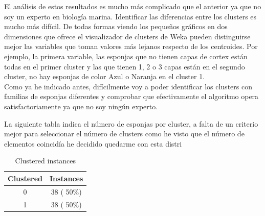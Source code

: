 \documentclass[es]{ifirak}
\begin{document}
El análisis de estos resultados es mucho más complicado que el anterior ya que no soy un experto en biología marina. Identificar las diferencias entre los clusters es mucho más difícil. De todas formas viendo los pequeños gráficos en dos dimensiones que ofrece el visualizador de clusters de Weka pueden distinguirse mejor las variables que toman valores más lejanos respecto de los centroides. Por ejemplo, la primera variable, las esponjas que no tienen capas de cortex están todas en el primer cluster y las que tienen 1, 2 o 3 capas están en el segundo cluster, no hay esponjas de color Azul o Naranja en el cluster 1.\\

Como ya he indicado antes, difícilmente voy a poder identificar los clusters con familias de esponjas diferentes y comprobar que efectivamente el algoritmo opera satisfactoriamente ya que no soy ningún experto.

La siguiente tabla indica el número de esponjas por cluster, a falta de un criterio mejor para seleccionar el número de clusters como he visto que el número de elementos coincidía he decidido quedarme con esta distri
\begin{table}[htbp]
	\centering
	\begin{tabular}{c|c}
		Clustered & Instances\\
		\hline
		0     &  38 ( 50\%)\\
		1     &  38 ( 50\%)\\
	\end{tabular}
	\caption{Clustered instances}\label{table}
\end{table}
\end{document}
